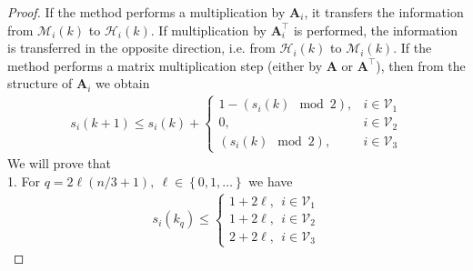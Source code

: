 \documentclass{article}
\newcommand{\cM}{\mathcal{M}}
\newcommand{\cH}{\mathcal{H}}
\newcommand{\cV}{\mathcal{V}}
\newcommand{\mA}{\mathbf{A}}
\newcommand{\cbraces}[1]{\left( #1 \right)}
\newcommand{\braces}[1]{\left\{ #1 \right\}}
\begin{document}
\begin{proof}
	If the method performs a multiplication by $\mA_i$, it transfers the information from $\cM_i(k)$ to $\cH_i(k)$. If multiplication by $\mA_i^\top$ is performed, the information is transferred in the opposite direction, i.e. from $\cH_i(k)$ to $\cM_i(k)$. If the method performs a matrix multiplication step (either by $\mA$ or $\mA^\top$), then from the structure of $\mA_i$ we obtain
	\begin{align*}
		s_i(k+1)\leq s_i(k) + \begin{cases} 1 - (s_i(k) \mod 2), &i\in\cV_1 \\ 0, &i\in\cV_2 \\ (s_i(k)\mod 2), &i\in\cV_3 \end{cases}
	\end{align*}
	We will prove that\\
	1. For $q = 2\ell(n/3 + 1),~ \ell\in\braces{0, 1, \ldots}$ we have
	\begin{align}\label{eq:info_flow_even}
		s_i(k_q)\leq
		\begin{cases}
			1 + 2\ell,~~ i\in\cV_1 \\
			1 + 2\ell,~~ i\in\cV_2 \\
			2 + 2\ell,~~ i\in\cV_3

\end{cases}
\end{align}
\end{proof}
\end{document}
